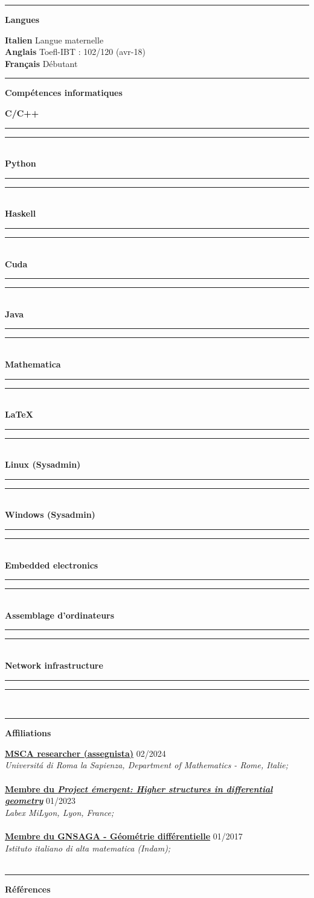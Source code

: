 \documentclass[a4paper]{article}
\newcommand{\crule}[3][black]{\textcolor{#1}{\rule{#2}{#3}}}
\newcommand{\progbar}[4][black]{\crule[#1]{#3}{#4}\crule[#1!10!white!90]{#2}{#4}}
\newcommand{\block}[1]{\hrule \vspace{0.2cm} \textbf{\Large #1} \vspace{0.2cm}}
\newcommand{\voice}[5]{\href{#4}{\textbf{#1}} \hfill #2 \\ \textit{#3} \\ {\small #5} \vspace{0.2cm} \\}
\newcommand{\skill}[2]{\textbf{#1} \hfill #2 \\}
\newcommand{\skillbar}[4]{\textbf{#1} \hfill \progbar{#2}{#3}{#4} \\}
\begin{document}
\hfill
\begin{minipage}[t]{0.375\columnwidth}
    

    \block{Langues} 
    
    
    \skill{Italien}{Langue maternelle}
    \skill{Anglais}{Toefl-IBT : 102/120 (avr-18)}
    \skill{Français}{Débutant}
        





    \block{Compétences informatiques} 
    
    
    \skillbar{C/C++}
    {1.4cm}
    {0.6cm}
    {0.25cm}
    \skillbar{Python}
    {1.1cm}
    {0.9cm}
    {0.25cm}
    \skillbar{Haskell}
    {1.5cm}
    {0.5cm}
    {0.25cm}
    \skillbar{Cuda}
    {1.1cm}
    {0.9cm}
    {0.25cm}
    \skillbar{Java}
    {1.2cm}
    {0.8cm}
    {0.25cm}
    \skillbar{Mathematica}
    {1.4cm}
    {0.6cm}
    {0.25cm}
    \skillbar{\LaTeX}
    {0.5cm}
    {1.5cm}
    {0.25cm}
    \skillbar{Linux (Sysadmin)}
    {0.7cm}
    {1.3cm}
    {0.25cm}
    \skillbar{Windows (Sysadmin)}
    {0.7cm}
    {1.3cm}
    {0.25cm}
    \skillbar{Embedded electronics}
    {1.5cm}
    {0.5cm}
    {0.25cm}
    \skillbar{Assemblage d'ordinateurs}
    {1.0cm}
    {1.0cm}
    {0.25cm}
    \skillbar{Network infrastructure}
    {1.6cm}
    {0.4cm}
    {0.25cm}





    \block{Affiliations}

    
    \voice{MSCA researcher (assegnista)}
        {02/2024}
        {Universit\'a di Roma la Sapienza, Department of Mathematics - Rome, Italie;}
        {https://www.mat.uniroma1.it/persone/miti}       
        {\vspace{-0.5cm}}
    \voice{Membre du \emph{Project \'emergent: Higher structures in differential geometry}}
        {01/2023}
        {Labex MiLyon, Lyon, France;}
        {https://www.dropbox.com/s/36kh0vre45r38b2/2301-MiLyon-HigherGeometry.pdf?dl=0}       
        {\vspace{-0.5cm}}
    \voice{Membre du  GNSAGA - Géométrie différentielle}
        {01/2017}
        {Istituto italiano di alta matematica (Indam);}
        {https://web.archive.org/web/20170924125645/http://www.altamatematica.it/gnsaga/node/23}       
        {\vspace{-0.5cm}}

        




    \block{Références}


\end{minipage}
\end{document}
